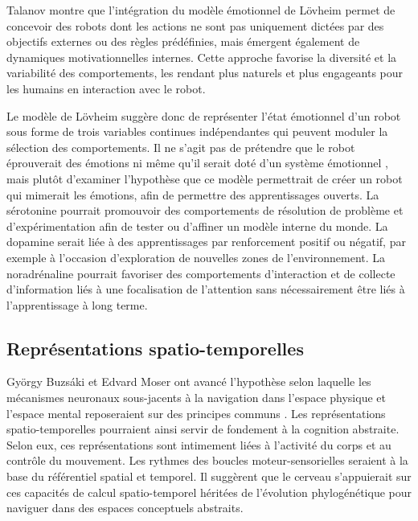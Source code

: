 Talanov montre que l’intégration du modèle émotionnel de Lövheim permet de concevoir des robots dont les actions ne sont pas uniquement dictées par des objectifs externes ou des règles prédéfinies, mais émergent également de dynamiques motivationnelles internes. 
Cette approche favorise la diversité et la variabilité des comportements, les rendant plus naturels et plus engageants pour les humains en interaction avec le robot.

Le modèle de Lövheim suggère donc de représenter l'état émotionnel d'un robot sous forme de trois variables continues indépendantes qui peuvent moduler la sélection des comportements. 
Il ne s'agit pas de prétendre que le robot éprouverait des émotions ni même qu'il serait \og doté d'un système émotionnel \fg, mais plutôt d'examiner l'hypothèse que ce modèle permettrait de créer un robot qui mimerait les émotions, afin de permettre des apprentissages ouverts.
La sérotonine pourrait promouvoir des comportements de résolution de problème et d'expérimentation afin de tester ou d'affiner un modèle interne du monde. 
La dopamine serait liée à des apprentissages par renforcement positif ou négatif, par exemple à l'occasion d'exploration de nouvelles zones de l'environnement. 
La noradrénaline pourrait favoriser des comportements d'interaction et de collecte d'information liés à une focalisation de l'attention sans nécessairement être liés à l'apprentissage à long terme. 


\subsection{Représentations spatio-temporelles}
\label{sec:espace}

\noindent
György Buzsáki et Edvard Moser ont avancé l’hypothèse selon laquelle les mécanismes neuronaux sous-jacents à la navigation dans l’espace physique et l'espace mental reposeraient sur des principes communs \cite{buzsaki_memory_2013}.
Les représentations spatio-temporelles pourraient ainsi servir de fondement à la cognition abstraite. 
Selon eux, ces représentations sont intimement liées à l'activité du corps et au contrôle du mouvement. 
Les rythmes des boucles moteur-sensorielles seraient à la base du référentiel spatial et temporel.  
Il suggèrent que le cerveau s'appuierait sur ces capacités de calcul spatio-temporel héritées de l'évolution phylogénétique
pour naviguer dans des espaces conceptuels abstraits.  


